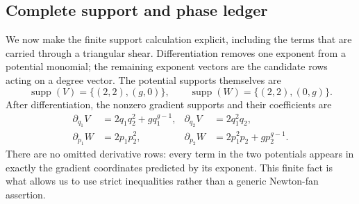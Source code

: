 \documentclass[11pt]{article}
\theoremstyle{remark}
\numberwithin{equation}{section}
\begin{document}
\subsection{Complete support and phase ledger}

We now make the finite support calculation explicit, including the terms that
are carried through a triangular shear.  Differentiation removes one exponent
from a potential monomial; the remaining exponent vectors are the candidate
rows acting on a degree vector.  The potential supports themselves are
\[
 \operatorname{supp}(V)=\{(2,2),(g,0)\},\qquad
 \operatorname{supp}(W)=\{(2,2),(0,g)\}.
\]
After differentiation, the nonzero gradient supports and their coefficients
are
\begin{align}
 \partial_{q_1}V&=2q_1q_2^2+gq_1^{g-1},&
 \partial_{q_2}V&=2q_1^2q_2,\label{eq:V-supports}\\
 \partial_{p_1}W&=2p_1p_2^2,&
 \partial_{p_2}W&=2p_1^2p_2+gp_2^{g-1}.
 \label{eq:W-supports}
\end{align}
There are no omitted derivative rows: every term in the two potentials appears
in exactly the gradient coordinates predicted by its exponent.  This finite
fact is what allows us to use strict inequalities rather than a generic
Newton-fan assertion.
\end{document}

